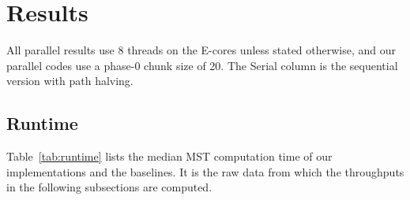 \documentclass[11pt,a4paper]{article}
\begin{document}
\section*{Results}
All parallel results use 8 threads on the E-cores unless stated otherwise, and our parallel codes use a phase-0 chunk size of 20. The Serial column is the sequential version with path halving.

\subsection*{Runtime}
Table~\ref{tab:runtime} lists the median MST computation time of our implementations and the baselines. It is the raw data from which the throughputs in the following subsections are computed.
 
\end{document}
